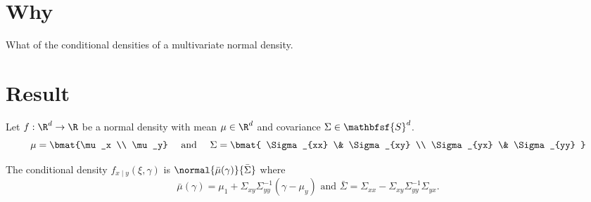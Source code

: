 
\section*{Why}

What of the conditional densities of a multivariate normal density.

\section*{Result}

\begin{prop}

Let $f: \R ^d \to \R $ be a normal density with mean $\mu \in \R ^d$ and covariance $\Sigma  \in \mathbfsf{S} ^d$.
  \[
\mu  = \bmat{\mu _x \\ \mu _y} \quad \text{ and } \quad
\Sigma  = \bmat{
\Sigma _{xx} \& \Sigma _{xy} \\
\Sigma _{yx} \& \Sigma _{yy}
}
  \]

The conditional density $f_{x \mid y}(\xi , \gamma )$ is $\normal{\bar{\mu }(\gamma )}{\bar{\Sigma }}$ where
  \[
\bar{\mu }(\gamma ) = \mu _1 + \Sigma _{xy}\Sigma _{yy}^{-1}(\gamma - \mu _y) \text{ and } \bar{\Sigma } = \Sigma _{xx} - \Sigma _{xy}\Sigma _{yy}^{-1}\Sigma _{yx}.
  \]
\end{prop}

\blankpage